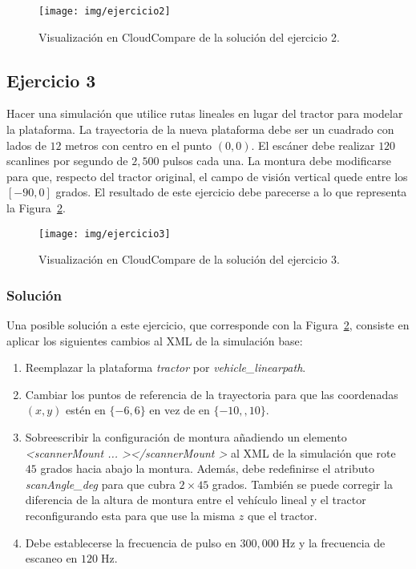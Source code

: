 \documentclass[]{article}
\begin{document}
	\begin{figure}[htb]
		\centering
		\texttt{[image: img/ejercicio2]}
		\caption{Visualización en CloudCompare de la solución del ejercicio 2.}
		\label{fig:ejercicio2}
	\end{figure} 

	
	\pagebreak


	\subsection*{Ejercicio 3}
	Hacer una simulación que utilice rutas lineales en lugar del tractor para modelar la plataforma. La trayectoria de la nueva plataforma debe ser un cuadrado con lados de $12$ metros con centro en el punto $(0, 0)$. El escáner debe realizar $120$ scanlines por segundo de $2,500$ pulsos cada una. La montura debe modificarse para que, respecto del tractor original, el campo de visión vertical quede entre los $[-90, 0]$ grados. El resultado de este ejercicio debe parecerse a lo que representa la Figura~\ref{fig:ejercicio3}.
	
	\begin{figure}[htb]
		\centering
		\texttt{[image: img/ejercicio3]}
		\caption{Visualización en CloudCompare de la solución del ejercicio 3.}
		\label{fig:ejercicio3}
	\end{figure} 

	\subsubsection*{Solución}
	Una posible solución a este ejercicio, que corresponde con la Figura~\ref{fig:ejercicio3}, consiste en aplicar los siguientes cambios al XML de la simulación base:
	
	\begin{enumerate}
		\item Reemplazar la plataforma \textit{tractor} por \textit{vehicle\_linearpath}.
		\item Cambiar los puntos de referencia de la trayectoria para que las coordenadas $(x, y)$ estén en $\{-6, 6\}$ en vez de en $\{-10, ,10\}$.
		\item Sobreescribir la configuración de montura añadiendo un elemento \textit{\textless scannerMount ... \textgreater \textless /scannerMount \textgreater} al XML de la simulación que rote $45$ grados hacia abajo la montura. Además, debe redefinirse el atributo \textit{scanAngle\_deg} para que cubra $2 \times 45$ grados. También se puede corregir la diferencia de la altura de montura entre el vehículo lineal y el tractor reconfigurando esta para que use la misma $z$ que el tractor.
		\item Debe establecerse la frecuencia de pulso en $300,000\;\text{Hz}$ y la frecuencia de escaneo en $120\;\text{Hz}$.
	\end{enumerate}
\end{document}

